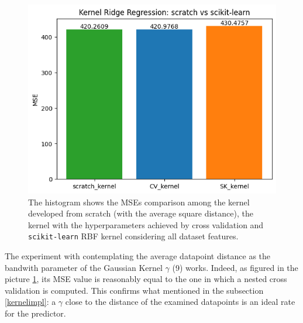 \documentclass{article}
\begin{document}
\begin{figure}[H]
	\begin{adjustwidth}{0 cm}{}
		\begin{center}
			\includegraphics[scale= 0.53]{images/finalKernel.png}
		\end{center}
	\end{adjustwidth}
	\caption{The histogram shows the MSEs comparison among the kernel developed from scratch (with the average square distance), the kernel with the hyperparameters achieved by cross validation and \texttt{scikit-learn} RBF kernel considering all dataset features.}
	\label{KRRcomparison}
\end{figure}

The experiment with contemplating the average datapoint distance as the bandwith parameter of the Gaussian Kernel $\gamma$ (9) works. Indeed, as figured in the picture \ref{KRRcomparison}, its MSE value is reasonably equal to the one in which a nested cross validation is computed. This confirms what mentioned in the subsection \ref{kernelimpl}: a $\gamma$ close to the distance of the examined datapoints is an ideal rate for the predictor. 

\vfill




\vspace{36pt}

\let\thefootnote\relax{}
\end{document}
